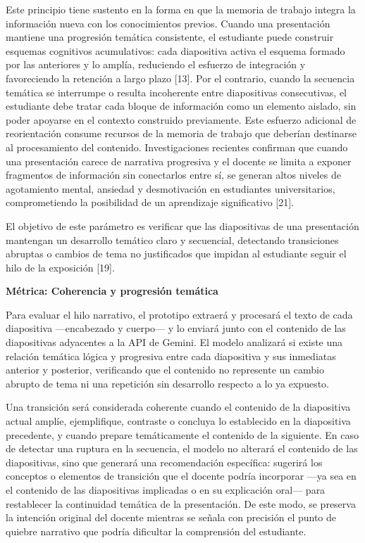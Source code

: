 \documentclass[11pt]{article}
\begin{document}
Este principio tiene sustento en la forma en que la memoria de trabajo integra la información nueva con los conocimientos previos. Cuando una presentación mantiene una progresión temática consistente, el estudiante puede construir esquemas cognitivos acumulativos: cada diapositiva activa el esquema formado por las anteriores y lo amplía, reduciendo el esfuerzo de integración y favoreciendo la retención a largo plazo [13]. Por el contrario, cuando la secuencia temática se interrumpe o resulta incoherente entre diapositivas consecutivas, el estudiante debe tratar cada bloque de información como un elemento aislado, sin poder apoyarse en el contexto construido previamente. Este esfuerzo adicional de reorientación consume recursos de la memoria de trabajo que deberían destinarse al procesamiento del contenido. Investigaciones recientes confirman que cuando una presentación carece de narrativa progresiva y el docente se limita a exponer fragmentos de información sin conectarlos entre sí, se generan altos niveles de agotamiento mental, ansiedad y desmotivación en estudiantes universitarios, comprometiendo la posibilidad de un aprendizaje significativo [21].

El objetivo de este parámetro es verificar que las diapositivas de una presentación mantengan un desarrollo temático claro y secuencial, detectando transiciones abruptas o cambios de tema no justificados que impidan al estudiante seguir el hilo de la exposición [19].

\textbf{Métrica: Coherencia y progresión temática}

Para evaluar el hilo narrativo, el prototipo extraerá y procesará el texto de cada diapositiva —encabezado y cuerpo— y lo enviará junto con el contenido de las diapositivas adyacentes a la API de Gemini. El modelo analizará si existe una relación temática lógica y progresiva entre cada diapositiva y sus inmediatas anterior y posterior, verificando que el contenido no represente un cambio abrupto de tema ni una repetición sin desarrollo respecto a lo ya expuesto.

Una transición será considerada coherente cuando el contenido de la diapositiva actual amplíe, ejemplifique, contraste o concluya lo establecido en la diapositiva precedente, y cuando prepare temáticamente el contenido de la siguiente. En caso de detectar una ruptura en la secuencia, el modelo no alterará el contenido de las diapositivas, sino que generará una recomendación específica: sugerirá los conceptos o elementos de transición que el docente podría incorporar —ya sea en el contenido de las diapositivas implicadas o en su explicación oral— para restablecer la continuidad temática de la presentación. De este modo, se preserva la intención original del docente mientras se señala con precisión el punto de quiebre narrativo que podría dificultar la comprensión del estudiante.
\end{document}
